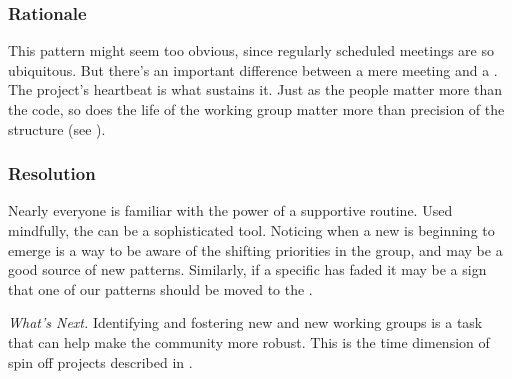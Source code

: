\subsubsection*{Rationale}  This pattern might seem too obvious, since regularly scheduled meetings are so ubiquitous.  
But there's an important difference between a mere meeting and a .  The project's heartbeat is what sustains it. Just as the people matter more than the code, so does the life of the working group matter more than precision of the structure (see ).

\subsubsection*{Resolution} Nearly everyone is familiar with the power of a supportive routine.  Used mindfully, the  can be a sophisticated tool.  Noticing when a new  is beginning to emerge is a way to be aware of the shifting priorities in the group, and may be a good source of new patterns.  Similarly, if a specific  has faded it may be a sign that one of our patterns should be moved to the .

\begin{framed}
\emph{What's Next.}
Identifying and fostering new  and new working groups is a task that can help make the community more robust.  This is the time dimension of spin off projects described in .
\end{framed}


